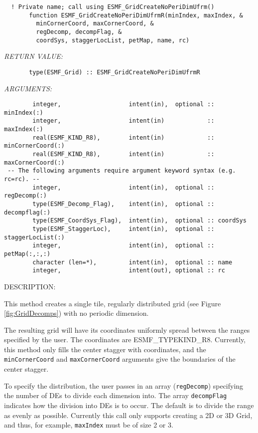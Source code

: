  
\begin{verbatim}  ! Private name; call using ESMF_GridCreateNoPeriDimUfrm()
       function ESMF_GridCreateNoPeriDimUfrmR(minIndex, maxIndex, &
         minCornerCoord, maxCornerCoord, &
         regDecomp, decompFlag, &
         coordSys, staggerLocList, petMap, name, rc)
 \end{verbatim}{\em RETURN VALUE:}
\begin{verbatim}       type(ESMF_Grid) :: ESMF_GridCreateNoPeriDimUfrmR\end{verbatim}{\em ARGUMENTS:}
\begin{verbatim}        integer,                   intent(in),  optional :: minIndex(:)
        integer,                   intent(in)            :: maxIndex(:)
        real(ESMF_KIND_R8),        intent(in)            :: minCornerCoord(:)
        real(ESMF_KIND_R8),        intent(in)            :: maxCornerCoord(:)
 -- The following arguments require argument keyword syntax (e.g. rc=rc). --
        integer,                   intent(in),  optional :: regDecomp(:)
        type(ESMF_Decomp_Flag),    intent(in),  optional :: decompflag(:)
        type(ESMF_CoordSys_Flag),  intent(in),  optional :: coordSys
        type(ESMF_StaggerLoc),     intent(in),  optional :: staggerLocList(:)
        integer,                   intent(in),  optional :: petMap(:,:,:)
        character (len=*),         intent(in),  optional :: name
        integer,                   intent(out), optional :: rc\end{verbatim}
{\sf DESCRIPTION:\\ }


  
   This method creates a single tile, regularly distributed grid
   (see Figure \ref{fig:GridDecomps}) with no periodic dimension.
  
   The resulting grid will have its coordinates uniformly spread between the
   ranges specified by the user. The coordinates are ESMF\_TYPEKIND\_R8.
   Currently, this method only fills the center stagger with coordinates, and
   the {\tt minCornerCoord} and {\tt maxCornerCoord} arguments give the boundaries of
   the center stagger.
  
   To specify the distribution, the user passes in an array
   ({\tt regDecomp}) specifying the number of DEs to divide each
   dimension into. The array {\tt decompFlag} indicates how the division into DEs is to
   occur.  The default is to divide the range as evenly as possible. Currently this call
   only supports creating a 2D or 3D Grid, and thus, for example, {\tt maxIndex} must be of size 2 or 3.
  
